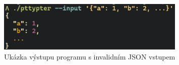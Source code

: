 \documentclass[11pt, letterpaper]{article}
\begin{document}
\begin{figure}[H]
    \begin{center}
        \includegraphics[width=0.8\textwidth]{term3}
    \end{center}
    \caption{Ukázka výstupu programu s invalidním JSON vstupem}
\end{figure}
\end{document}

